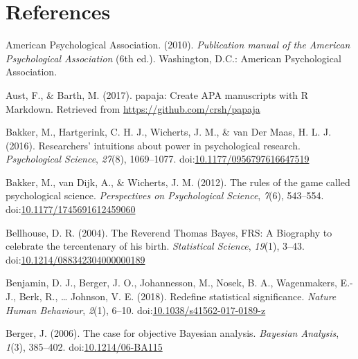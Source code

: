 \documentclass[,man, mask]{apa6}
\begin{document}
\newpage

\hypertarget{references}{%
\section{References}\label{references}}

\setlength{\parindent}{-0.5in}
\setlength{\leftskip}{0.5in}

\hypertarget{refs}{}
\leavevmode\hypertarget{ref-AmericanPsychologicalAssociation2010}{}%
American Psychological Association. (2010). \emph{Publication manual of the American Psychological Association} (6th ed.). Washington, D.C.: American Psychological Association.

\leavevmode\hypertarget{ref-Aust2017}{}%
Aust, F., \& Barth, M. (2017). papaja: Create APA manuscripts with R Markdown. Retrieved from \url{https://github.com/crsh/papaja}

\leavevmode\hypertarget{ref-Bakker2016}{}%
Bakker, M., Hartgerink, C. H. J., Wicherts, J. M., \& van Der Maas, H. L. J. (2016). Researchers' intuitions about power in psychological research. \emph{Psychological Science}, \emph{27}(8), 1069--1077. doi:\href{https://doi.org/10.1177/0956797616647519}{10.1177/0956797616647519}

\leavevmode\hypertarget{ref-Bakker2012}{}%
Bakker, M., van Dijk, A., \& Wicherts, J. M. (2012). The rules of the game called psychological science. \emph{Perspectives on Psychological Science}, \emph{7}(6), 543--554. doi:\href{https://doi.org/10.1177/1745691612459060}{10.1177/1745691612459060}

\leavevmode\hypertarget{ref-Bellhouse2004}{}%
Bellhouse, D. R. (2004). The Reverend Thomas Bayes, FRS: A Biography to celebrate the tercentenary of his birth. \emph{Statistical Science}, \emph{19}(1), 3--43. doi:\href{https://doi.org/10.1214/088342304000000189}{10.1214/088342304000000189}

\leavevmode\hypertarget{ref-Benjamin2017}{}%
Benjamin, D. J., Berger, J. O., Johannesson, M., Nosek, B. A., Wagenmakers, E.-J., Berk, R., \ldots{} Johnson, V. E. (2018). Redefine statistical significance. \emph{Nature Human Behaviour}, \emph{2}(1), 6--10. doi:\href{https://doi.org/10.1038/s41562-017-0189-z}{10.1038/s41562-017-0189-z}

\leavevmode\hypertarget{ref-Berger2006}{}%
Berger, J. (2006). The case for objective Bayesian analysis. \emph{Bayesian Analysis}, \emph{1}(3), 385--402. doi:\href{https://doi.org/10.1214/06-BA115}{10.1214/06-BA115}
\end{document}
